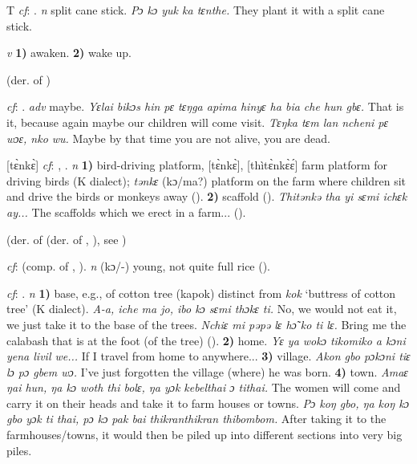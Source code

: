 \begin{letter}{T}
 \textit{cf}: . \textit{n} split cane stick. \textit{Pɔ kɔ yuk ka tɛnthe.} They plant it with a split cane stick.

 \textit{v} \textbf{1)} awaken. \textbf{2)} wake up.

 (der. of ) 

 \textit{cf}: . \textit{adv} maybe. \textit{Yɛlai bikɔs hin pɛ tɛŋga apima hinyɛ ha bia che hun gbɛ.} That is it, because again maybe our children will come visit. \textit{Tɛŋka tɛm lan ncheni pɛ wɔɛ, nko wu.} Maybe by that time you are not alive, you are dead.

 [tɛ̀nkɛ̀] \textit{cf}: , . \textit{n} \textbf{1)} bird-driving platform, [tɛ̀nkɛ̀], [thìtɛ̀nkɛ̀ɛ́] farm platform for driving birds (K dialect); \textit{tənkɛ} (kɔ/ma?) platform on the farm where children sit and drive the birds or monkeys away (\citealt{Pichl1967}). \textbf{2)} scaffold (\citealt{Sumner1921}). \textit{Thitənkə tha yi sɛmi ichɛk ay...} The scaffolds which we erect in a farm... (\citealt{Pichl1967}). 

 (der. of  (der. of , ), see ) 

 \textit{cf}:  (comp. of , ). \textit{n} (kɔ/-) young, not quite full rice (\citealt{Pichl1967}).

 \textit{cf}: . \textit{n} \textbf{1)} base, e.g., of cotton tree (kapok) distinct from \textit{kok} ‘buttress of cotton tree' (K dialect). \textit{A-a, iche ma jo, ibo kɔ sɛmi thɔkɛ ti.} No, we would not eat it, we just take it to the base of the trees. \textit{Nchiɛ mi pəpə lɛ hɔ̃ ko ti lɛ.} Bring me the calabash that is at the foot (of the tree) (\citealt{Pichl1967}). \textbf{2)} home. \textit{Yɛ ya wokɔ tikomiko a kɔni yena livil we...} If I travel from home to anywhere... \textbf{3)} village. \textit{Akon gbo pɔkɔni tiɛ lɔ pɔ gbem wɔ.} I've just forgotten the village (where) he was born. \textbf{4)} town. \textit{Amaɛ ŋai hun, ŋa kɔ woth thi bolɛ, ŋa yɔk kebelthai ɔ tithai.} The women will come and carry it on their heads and take it to farm houses or towns. \textit{Pɔ koŋ gbo, ŋa koŋ kɔ gbo yɔk ti thai, pɔ kɔ pak bai thikranthikran thibombom.} After taking it to the farmhouses/towns, it would then be piled up into different sections into very big piles.


\end{letter}

